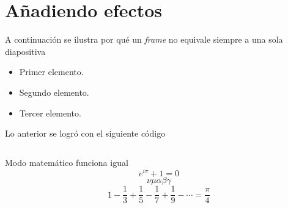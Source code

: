 \documentclass{beamer}
\begin{document}
    \section{Añadiendo efectos}
    \begin{frame}{\insertsection}
        A continuación se ilustra por qué un \textsl{frame} no equivale siempre a una sola diapositiva \pause \\ [3ex]
        \begin{minipage}{0.45\linewidth}
            \begin{itemize}
                \item Primer elemento.\pause
                \item Segundo elemento.\pause
                \item Tercer elemento.\pause
            \end{itemize}
        \end{minipage}
        \begin{minipage}{0.45\linewidth}
            Lo anterior se logró con el siguiente código \pause
            \inputminted[fontsize=\scriptsize, frame=single]{latex}{pause_ex.tex}
        \end{minipage}
    \end{frame}

    \begin{frame}{Modo matemático funciona igual}
        \begin{equation}
            e^{i\pi} + 1 = 0
        \end{equation}
        \begin{equation}
            \nu\mu\alpha\beta\gamma
        \end{equation}
        \begin{equation}
            1 - \frac{1}{3} + \frac{1}{5} - \frac{1}{7} + \frac{1}{9} - \cdots = \frac{\pi}{4}
        \end{equation}
    \end{frame}

    
\end{document}
